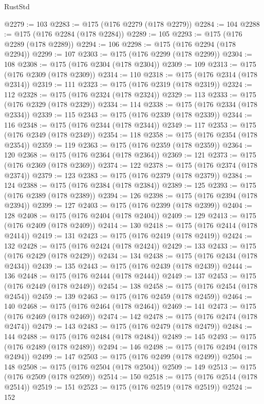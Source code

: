 \begin{lexlean}{RustStd}
\begin{coremodule}
@2279 := 103
@2283 := @175 (@176 @2279 (@178 @2279))
@2284 := 104
@2288 := @175 (@176 @2284 (@178 @2284))
@2289 := 105
@2293 := @175 (@176 @2289 (@178 @2289))
@2294 := 106
@2298 := @175 (@176 @2294 (@178 @2294))
@2299 := 107
@2303 := @175 (@176 @2299 (@178 @2299))
@2304 := 108
@2308 := @175 (@176 @2304 (@178 @2304))
@2309 := 109
@2313 := @175 (@176 @2309 (@178 @2309))
@2314 := 110
@2318 := @175 (@176 @2314 (@178 @2314))
@2319 := 111
@2323 := @175 (@176 @2319 (@178 @2319))
@2324 := 112
@2328 := @175 (@176 @2324 (@178 @2324))
@2329 := 113
@2333 := @175 (@176 @2329 (@178 @2329))
@2334 := 114
@2338 := @175 (@176 @2334 (@178 @2334))
@2339 := 115
@2343 := @175 (@176 @2339 (@178 @2339))
@2344 := 116
@2348 := @175 (@176 @2344 (@178 @2344))
@2349 := 117
@2353 := @175 (@176 @2349 (@178 @2349))
@2354 := 118
@2358 := @175 (@176 @2354 (@178 @2354))
@2359 := 119
@2363 := @175 (@176 @2359 (@178 @2359))
@2364 := 120
@2368 := @175 (@176 @2364 (@178 @2364))
@2369 := 121
@2373 := @175 (@176 @2369 (@178 @2369))
@2374 := 122
@2378 := @175 (@176 @2374 (@178 @2374))
@2379 := 123
@2383 := @175 (@176 @2379 (@178 @2379))
@2384 := 124
@2388 := @175 (@176 @2384 (@178 @2384))
@2389 := 125
@2393 := @175 (@176 @2389 (@178 @2389))
@2394 := 126
@2398 := @175 (@176 @2394 (@178 @2394))
@2399 := 127
@2403 := @175 (@176 @2399 (@178 @2399))
@2404 := 128
@2408 := @175 (@176 @2404 (@178 @2404))
@2409 := 129
@2413 := @175 (@176 @2409 (@178 @2409))
@2414 := 130
@2418 := @175 (@176 @2414 (@178 @2414))
@2419 := 131
@2423 := @175 (@176 @2419 (@178 @2419))
@2424 := 132
@2428 := @175 (@176 @2424 (@178 @2424))
@2429 := 133
@2433 := @175 (@176 @2429 (@178 @2429))
@2434 := 134
@2438 := @175 (@176 @2434 (@178 @2434))
@2439 := 135
@2443 := @175 (@176 @2439 (@178 @2439))
@2444 := 136
@2448 := @175 (@176 @2444 (@178 @2444))
@2449 := 137
@2453 := @175 (@176 @2449 (@178 @2449))
@2454 := 138
@2458 := @175 (@176 @2454 (@178 @2454))
@2459 := 139
@2463 := @175 (@176 @2459 (@178 @2459))
@2464 := 140
@2468 := @175 (@176 @2464 (@178 @2464))
@2469 := 141
@2473 := @175 (@176 @2469 (@178 @2469))
@2474 := 142
@2478 := @175 (@176 @2474 (@178 @2474))
@2479 := 143
@2483 := @175 (@176 @2479 (@178 @2479))
@2484 := 144
@2488 := @175 (@176 @2484 (@178 @2484))
@2489 := 145
@2493 := @175 (@176 @2489 (@178 @2489))
@2494 := 146
@2498 := @175 (@176 @2494 (@178 @2494))
@2499 := 147
@2503 := @175 (@176 @2499 (@178 @2499))
@2504 := 148
@2508 := @175 (@176 @2504 (@178 @2504))
@2509 := 149
@2513 := @175 (@176 @2509 (@178 @2509))
@2514 := 150
@2518 := @175 (@176 @2514 (@178 @2514))
@2519 := 151
@2523 := @175 (@176 @2519 (@178 @2519))
@2524 := 152

\end{coremodule}
\end{lexlean}
